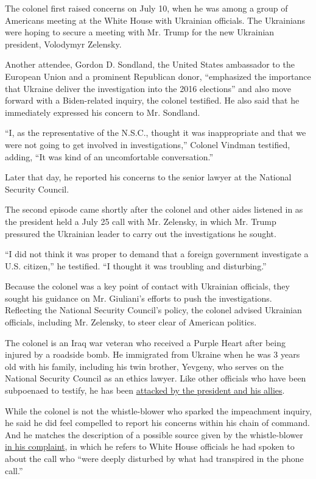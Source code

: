 The colonel first raised concerns on July 10, when he was among a group
of Americans meeting at the White House with Ukrainian officials. The
Ukrainians were hoping to secure a meeting with Mr. Trump for the new
Ukrainian president, Volodymyr Zelensky.

Another attendee, Gordon D. Sondland, the United States ambassador to
the European Union and a prominent Republican donor, ``emphasized the
importance that Ukraine deliver the investigation into the 2016
elections'' and also move forward with a Biden-related inquiry, the
colonel testified. He also said that he immediately expressed his
concern to Mr. Sondland.

``I, as the representative of the N.S.C., thought it was inappropriate
and that we were not going to get involved in investigations,'' Colonel
Vindman testified, adding, ``It was kind of an uncomfortable
conversation.''

Later that day, he reported his concerns to the senior lawyer at the
National Security Council.

The second episode came shortly after the colonel and other aides
listened in as the president held a July 25 call with Mr. Zelensky, in
which Mr. Trump pressured the Ukrainian leader to carry out the
investigations he sought.

``I did not think it was proper to demand that a foreign government
investigate a U.S. citizen,'' he testified. ``I thought it was troubling
and disturbing.''

Because the colonel was a key point of contact with Ukrainian officials,
they sought his guidance on Mr. Giuliani's efforts to push the
investigations. Reflecting the National Security Council's policy, the
colonel advised Ukrainian officials, including Mr. Zelensky, to steer
clear of American politics.

The colonel is an Iraq war veteran who received a Purple Heart after
being injured by a roadside bomb. He immigrated from Ukraine when he was
3 years old with his family, including his twin brother, Yevgeny, who
serves on the National Security Council as an ethics lawyer. Like other
officials who have been subpoenaed to testify, he has been
\href{https://www.nytimes.com/2019/11/06/us/politics/trump-vindman-twitter.html}{attacked
by the president and his allies}.

While the colonel is not the whistle-blower who sparked the impeachment
inquiry, he said he did feel compelled to report his concerns within his
chain of command. And he matches the description of a possible source
given by the whistle-blower
\href{https://www.nytimes.com/interactive/2019/09/26/us/politics/whistle-blower-complaint.html}{in
his complaint}, in which he refers to White House officials he had
spoken to about the call who ``were deeply disturbed by what had
transpired in the phone call.''

